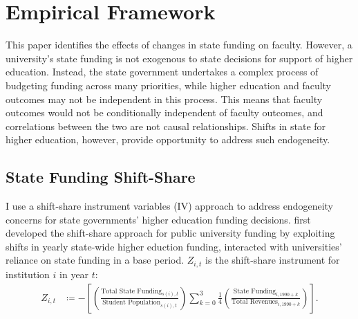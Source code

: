 \section{Empirical Framework}
\label{sec:empirics}

This paper identifies the effects of changes in state funding on faculty.
However, a university's state funding is not exogenous to state decisions for support of higher education.
Instead, the state government undertakes a complex process of budgeting funding across many priorities, while higher education and faculty outcomes may not be independent in this process.
This means that faculty outcomes would not be conditionally independent of faculty outcomes, and correlations between the two are not causal relationships.
Shifts in state for higher education, however, provide opportunity to address such endogeneity.

\subsection{State Funding Shift-Share}
\label{sec:approp-shocks}
I use a shift-share instrument variables (IV) approach to address endogeneity concerns for state governments' higher education funding decisions.
\cite{NBERw23736,NBERw27885} first developed the shift-share approach for public university funding by exploiting shifts in yearly state-wide higher eduction funding, interacted with universities' reliance on state funding in a base period.
$Z_{i,t}$ is the shift-share instrument for institution $i$ in year $t$:
\begin{align}
    \label{eqn:public-instrument}
    Z_{i,t} &\coloneqq - \left[
    \left( \frac{\text{Total State Funding}_{s(i),t}}{\text{Student Population}_{s(i),t}} \right)
    \sum_{k = 0}^{3} \frac 14
    \left( \frac{\text{State Funding}_{i,1990 + k}}{\text{Total Revenues}_{i,1990 + k}} \right) \right].
\end{align}

